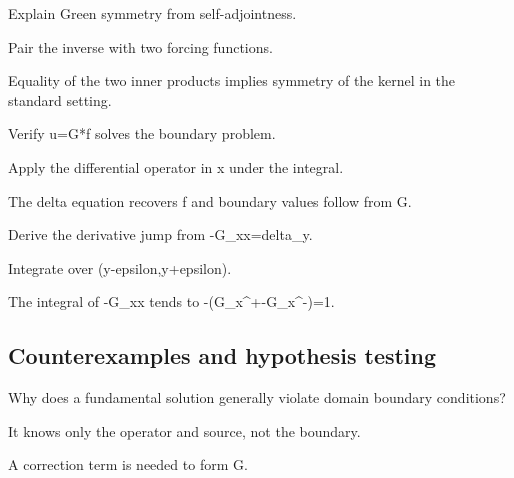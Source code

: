 \begin{exercise}\label{exr:iii25-expand-07}
Explain Green symmetry from self-adjointness.
\end{exercise}
\begin{hint}
Pair the inverse with two forcing functions.
\end{hint}
\begin{solution}
Equality of the two inner products implies symmetry of the kernel in the standard setting.
\end{solution}

\begin{exercise}\label{exr:iii25-expand-08}
Verify u=G*f solves the boundary problem.
\end{exercise}
\begin{hint}
Apply the differential operator in x under the integral.
\end{hint}
\begin{solution}
The delta equation recovers f and boundary values follow from G.
\end{solution}

\begin{exercise}\label{exr:iii25-expand-09}
Derive the derivative jump from -G\_xx=delta\_y.
\end{exercise}
\begin{hint}
Integrate over (y-epsilon,y+epsilon).
\end{hint}
\begin{solution}
The integral of -G\_xx tends to -(G\_x\textasciicircum{}+-G\_x\textasciicircum{}-)=1.
\end{solution}

\subsection*{Counterexamples and hypothesis testing}

\begin{exercise}\label{exr:iii25-expand-10}
Why does a fundamental solution generally violate domain boundary conditions?
\end{exercise}
\begin{hint}
It knows only the operator and source, not the boundary.
\end{hint}
\begin{solution}
A correction term is needed to form G.
\end{solution}

